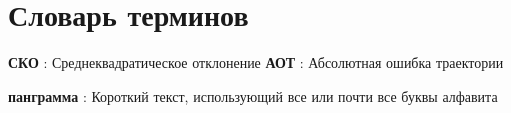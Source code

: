 \chapter*{Словарь терминов}             %

\textbf{СКО} : Среднеквадратическое отклонение 
\textbf{АОТ} : Абсолютная ошибка траектории

\textbf{панграмма} : Короткий текст, использующий все или почти все буквы алфавита
